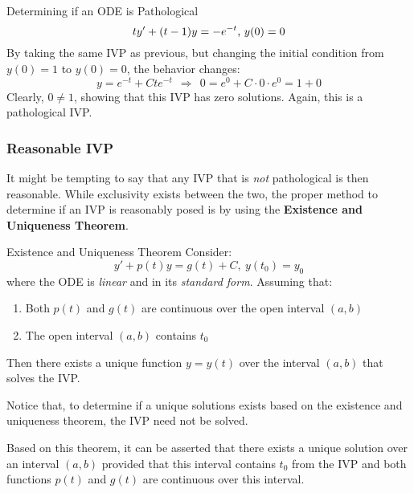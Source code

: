 \documentclass[12pt]{article}
\begin{document}
\begin{example}{Determining if an ODE is Pathological}
  \begin{equation*}
    ty'+(t-1)y = -e^{-t}\textup{,}\ y(0) = 0
  \end{equation*}
  By taking the same IVP as previous, but changing the initial condition from $y(0) = 1$ to $y(0) = 0$, the behavior changes:
  \begin{equation*}
    y = e^{-t} + Cte^{-t}\ \  \Rightarrow\ \ 0 = e^{0} + C \cdot 0 \cdot e^{0} = 1 + 0
  \end{equation*}
  Clearly, $0 \neq 1$, showing that this IVP has zero solutions. Again, this is a pathological IVP.
\end{example}

\subsubsection{Reasonable IVP}
\label{sssec:reasonableIVP}

It might be tempting to say that any IVP that is \textit{not} pathological is then reasonable. While exclusivity exists between the two, the proper method to determine if an IVP is reasonably posed is by using the \textbf{Existence and Uniqueness Theorem}.

\begin{definition}{Existence and Uniqueness Theorem}
  Consider:
  \begin{equation*}
    y' + p(t)y = g(t) + C,\ y(t_0) = y_0
  \end{equation*}
  where the ODE is \textit{linear} and in its \textit{standard form}.
  Assuming that:
  \begin{enumerate}
    \itemsep-0.15em
    \item Both $p(t)$ and $g(t)$ are continuous over the open interval $(a,b)$
    \item The open interval $(a,b)$ contains $t_0$
  \end{enumerate}
  Then there exists a unique function $y = y(t)$ over the interval $(a,b)$ that solves the IVP.
\end{definition}

Notice that, to determine if a unique solutions exists based on the existence and uniqueness theorem, the IVP need not be solved.

Based on this theorem, it can be asserted that there exists a unique solution over an interval $(a,b)$ provided that this interval contains $t_0$ from the IVP and both functions $p(t)$ and $g(t)$ are continuous over this interval.
\end{document}
